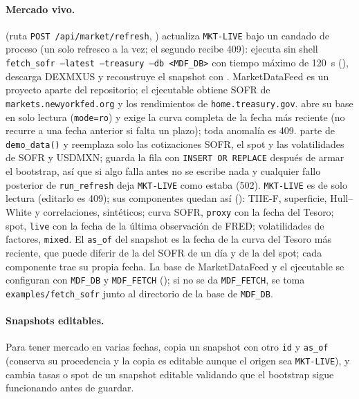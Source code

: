 \begin{sloppypar}
\paragraph{Mercado vivo.}  (ruta \texttt{POST /api/market/refresh},
) actualiza \texttt{MKT-LIVE} bajo un candado de proceso (un
solo refresco a la vez; el segundo recibe 409): ejecuta sin shell
\texttt{fetch\_sofr --latest --treasury --db <MDF\_DB>} con tiempo máximo de 120~s
(), descarga DEXMXUS y reconstruye el snapshot con
. MarketDataFeed es un proyecto aparte del repositorio; el
ejecutable obtiene SOFR de \texttt{markets.newyorkfed.org} y los rendimientos de \texttt{home.treasury.gov}.
 abre su base en solo lectura (\texttt{mode=ro}) y exige la
curva completa de la fecha más reciente (no recurre a una fecha anterior si falta un plazo); toda anomalía es
409.  parte de \texttt{demo\_data()} y reemplaza solo las
cotizaciones SOFR, el spot y las volatilidades de SOFR y USDMXN; 
guarda la fila con \texttt{INSERT OR REPLACE} después de armar el bootstrap, así que si algo falla antes no se
escribe nada y cualquier fallo posterior de \texttt{run\_refresh} deja \texttt{MKT-LIVE} como estaba (502).
\texttt{MKT-LIVE} es de solo lectura (editarlo es 409); sus componentes quedan así
(): TIIE-F, superficie, Hull--White y correlaciones, sintéticos;
curva SOFR, \texttt{proxy} con la fecha del Tesoro; spot, \texttt{live} con la fecha de la última observación de
FRED; volatilidades de factores, \texttt{mixed}. El \texttt{as\_of} del snapshot es la fecha de la curva del
Tesoro más reciente, que puede diferir de la del SOFR de un día y de la del spot; cada componente trae su propia
fecha. La base de MarketDataFeed y el ejecutable se configuran con \texttt{MDF\_DB} y \texttt{MDF\_FETCH}
(); si no se da \texttt{MDF\_FETCH}, se toma
\texttt{examples/fetch\_sofr} junto al directorio de la base de \texttt{MDF\_DB}.

\paragraph{Snapshots editables.} Para tener mercado en varias fechas, 
copia un snapshot con otro \texttt{id} y \texttt{as\_of} (conserva su procedencia y la copia es editable aunque el
origen sea \texttt{MKT-LIVE}), y  cambia tasas o spot de un
snapshot editable validando que el bootstrap sigue funcionando antes de guardar.


\end{sloppypar}
